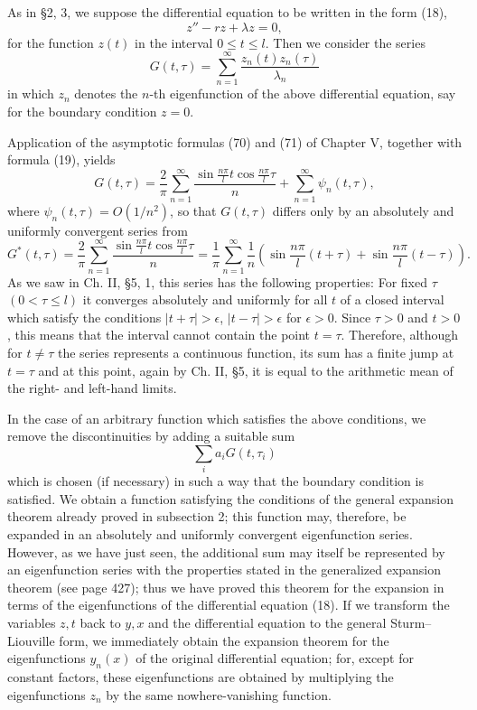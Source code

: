 As in \S2, 3, we suppose the differential equation to be written in the form (18),
\[
z''-rz+\lambda z=0,
\]
for the function $z(t)$ in the interval $0\le t\le l$. Then we consider the series
\[
G(t,\tau)=\sum_{n=1}^\infty\frac{z_n(t)z_n(\tau)}{\lambda_n}
\]
in which $z_n$ denotes the $n$-th eigenfunction of the above differential equation, say for the boundary condition $z=0$.

Application of the asymptotic formulas (70) and (71) of Chapter V, together with formula (19), yields
\[
G(t,\tau)=\frac{2}{\pi}\sum_{n=1}^\infty
\frac{\sin\frac{n\pi}{l}t\cos\frac{n\pi}{l}\tau}{n}
+\sum_{n=1}^\infty\psi_n(t,\tau),
\]
where $\psi_n(t,\tau)=O(1/n^2)$, so that $G(t,\tau)$ differs only by an absolutely and uniformly convergent series from
\[
G^*(t,\tau)=\frac{2}{\pi}\sum_{n=1}^\infty
\frac{\sin\frac{n\pi}{l}t\cos\frac{n\pi}{l}\tau}{n}
=\frac1\pi\sum_{n=1}^\infty\frac1n\left(
\sin\frac{n\pi}{l}(t+\tau)+\sin\frac{n\pi}{l}(t-\tau)\right).
\]
As we saw in Ch. II, \S5, 1, this series has the following properties: For fixed $\tau$ $(0<\tau\le l)$ it converges absolutely and uniformly for all $t$ of a closed interval which satisfy the conditions $|t+\tau|>\epsilon$, $|t-\tau|>\epsilon$ for $\epsilon>0$. Since $\tau>0$ and $t>0$, this means that the interval cannot contain the point $t=\tau$. Therefore, although for $t\ne\tau$ the series represents a continuous function, its sum has a finite jump at $t=\tau$ and at this point, again by Ch. II, \S5, it is equal to the arithmetic mean of the right- and left-hand limits.

In the case of an arbitrary function which satisfies the above conditions, we remove the discontinuities by adding a suitable sum
\[
\sum_i a_iG(t,\tau_i)
\]
which is chosen (if necessary) in such a way that the boundary condition is satisfied. We obtain a function satisfying the conditions of the general expansion theorem already proved in subsection 2; this function may, therefore, be expanded in an absolutely and uniformly convergent eigenfunction series. However, as we have just seen, the additional sum may itself be represented by an eigenfunction series with the properties stated in the generalized expansion theorem (see page 427); thus we have proved this theorem for the expansion in terms of the eigenfunctions of the differential equation (18). If we transform the variables $z,t$ back to $y,x$ and the differential equation to the general Sturm--Liouville form, we immediately obtain the expansion theorem for the eigenfunctions $y_n(x)$ of the original differential equation; for, except for constant factors, these eigenfunctions are obtained by multiplying the eigenfunctions $z_n$ by the same nowhere-vanishing function.

